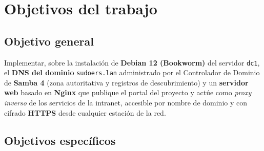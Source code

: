 
\section{Objetivos del trabajo}

\subsection{Objetivo general}

Implementar, sobre la instalaci\'on de \textbf{Debian 12 (Bookworm)} del
servidor \texttt{dc1}, el \textbf{DNS del dominio} \texttt{sudoers.lan}
administrado por el Controlador de Dominio de \textbf{Samba 4} (zona
autoritativa y registros de descubrimiento) y un \textbf{servidor web} basado
en \textbf{Nginx} que publique el portal del proyecto y act\'ue como
\textit{proxy inverso} de los servicios de la intranet, accesible por nombre
de dominio y con cifrado \textbf{HTTPS} desde cualquier estaci\'on de la red.

\subsection{Objetivos espec\'ificos}

